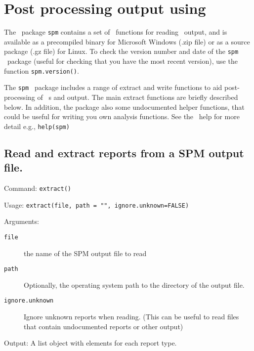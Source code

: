 \section{Post processing output using \R \label{sec:post-processing}}

The \R\ package \texttt{spm} contains a set of \R\ functions for reading \SPM\ output, and is available as a precompiled binary for Microsoft Windows (.zip file) or as a source package (.gz file) for Linux. To check the version number and date of the \texttt{spm} \R\ package (useful for checking that you have the most recent version), use the function \texttt{spm.version()}.

The \texttt{spm} \R\ package includes a range of extract and write functions to aid post-processing of \SPM\ \config s and output. The main extract functions are briefly described below. In addition, the package also some undocumented helper functions, that could be useful for writing you own analysis functions. See the \R\ help for more detail e.g., \texttt{help(spm)}

\subsection{Read and extract reports from a SPM output file.}

Command: \texttt{extract()} 

Usage: \texttt{extract(file, path = "", ignore.unknown=FALSE)}

Arguments:
\begin{description}
\item[\texttt{file}] the name of the SPM output file to read
\item[\texttt{path}] Optionally, the operating system path to the directory of the output file.
\item[\texttt{ignore.unknown}] Ignore unknown reports when reading. (This can be useful to read files that contain undocumented reports or other output)
\end{description}

Output: A list object with elements for each report type.
